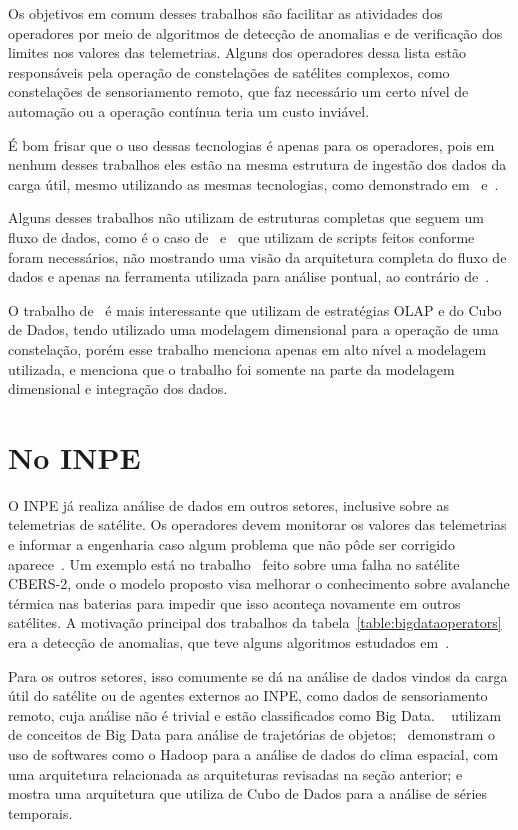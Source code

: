 Os objetivos em comum desses trabalhos são facilitar as atividades dos operadores por meio de algoritmos de detecção de anomalias e de verificação dos limites nos valores das telemetrias. Alguns dos operadores dessa lista estão responsáveis pela operação de constelações de satélites complexos, como constelações de sensoriamento remoto, que faz necessário um certo nível de automação ou a operação contínua teria um custo inviável.

É bom frisar que o uso dessas tecnologias é apenas para os operadores, pois em nenhum desses trabalhos eles estão na mesma estrutura de ingestão dos dados da carga útil, mesmo utilizando as mesmas tecnologias, como demonstrado em~\cite{mateikUsingBigData2017} e~\cite{adamskiDataAnalyticsLarge2016}.

Alguns desses trabalhos não utilizam de estruturas completas que seguem um fluxo de dados, como é o caso de~\cite{fernandezTelemetryAnomalyDetection2017} e~\cite{trollopeAnalysisAutomatedTechniques2018} que utilizam de scripts feitos conforme foram necessários, não mostrando uma visão da arquitetura completa do fluxo de dados e apenas na ferramenta utilizada para análise pontual, ao contrário de~\cite{yvernesCopernicusGroundSegment2018}.

O trabalho de~\cite{yvernesCopernicusGroundSegment2018} é mais interessante que utilizam de estratégias OLAP e do Cubo de Dados, tendo utilizado uma modelagem dimensional para a operação de uma constelação, porém esse trabalho menciona apenas em alto nível a modelagem utilizada, e menciona que o trabalho foi somente na parte da modelagem dimensional e integração dos dados.

\section{No INPE}

O INPE já realiza análise de dados em outros setores, inclusive sobre as telemetrias de satélite.
Os operadores devem monitorar os valores das telemetrias e informar a engenharia caso algum problema que não pôde ser corrigido aparece~\cite{TominagaFerrAmbr:2017:CoSaTe}.
Um exemplo está no trabalho~\cite{Magalhaes:2012:EsAvTe} feito sobre uma falha no satélite CBERS-2, onde o modelo proposto visa melhorar o conhecimento sobre avalanche térmica nas baterias para impedir que isso aconteça novamente em outros satélites.
A motivação principal dos trabalhos da tabela~\ref{table:bigdataoperators} era a detecção de anomalias, que teve alguns algoritmos estudados em~\cite{AzevedoAmbrViei::EsSoTe}.

Para os outros setores, isso comumente se dá na análise de dados vindos da carga útil do satélite ou de agentes externos ao INPE, como dados de sensoriamento remoto, cuja análise não é trivial e estão classificados como Big Data.
~\cite{monteiroFRAMEWORKTRAJECTORYDATA2017} utilizam de conceitos de Big Data para análise de trajetórias de objetos;~\cite{ramosDistributedSystemsPerformance2016} demonstram o uso de softwares como o Hadoop para a análise de dados do clima espacial, com uma arquitetura relacionada as arquiteturas revisadas na seção anterior; e~\cite{SimoesCamaQuei:2018:DaAnMa} mostra uma arquitetura que utiliza de Cubo de Dados para a análise de séries temporais.

